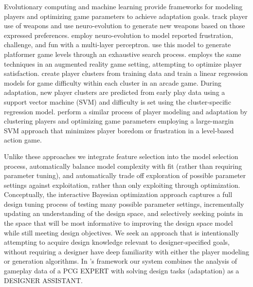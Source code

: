 \documentclass{sig-alternate}
\begin{document}
Evolutionary computing and machine learning provide frameworks for modeling players and optimizing game parameters to achieve adaptation goals.
\cite{hastings2009:gar} track player use of weapons and use neuro-evolution to generate new weapons based on those expressed preferences.
\cite{pedersen2009:smb} employ neuro-evolution to model reported frustration, challenge, and fun with a multi-layer perceptron. 
\cite{shaker2010:platformer-gen} use this model to generate platformer game levels through an exhaustive search process. 
\cite{yannakakis2009:playermodel} employs the same techniques in an augmented reality game setting, attempting to optimize player satisfaction.
\cite{missura2009:dda} create player clusters from training data and train a linear regression models for game difficulty within each cluster in an arcade game. During adaptation, new player clusters are predicted from early play data using a support vector machine (SVM) and difficulty is set using the cluster-specific regression model.
\cite{yu2011:minboredom} perform a similar process of player modeling and adaptation by clustering players and optimizing game parameters employing a large-margin SVM approach that minimizes player boredom or frustration in a level-based action game. 

Unlike these  approaches we integrate feature selection into the model selection process, automatically balance model complexity with fit (rather than requiring parameter tuning), and automatically trade off exploration of possible parameter settings against exploitation, rather than only exploiting through optimization. Conceptually, the interactive Bayesian optimization approach captures a full design tuning process of testing many possible parameter settings, incrementally updating an understanding of the design space, and selectively seeking points in the space that will be most informative to improving the design space model while still meeting design objectives. We seek an approach that is intentionally attempting to acquire design knowledge relevant to designer-specified goals, without requiring a designer have deep familiarity with either the player modeling or generation algorithms. In \cite{khaled2013:pcg-metaphor}'s framework our system combines the analysis of gameplay data of a PCG EXPERT with solving design tasks (adaptation) as a DESIGNER ASSISTANT. 
\end{document}
